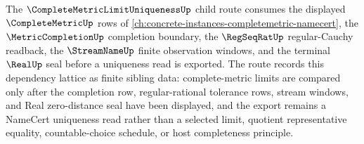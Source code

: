 The $\CompleteMetricLimitUniquenessUp$ child route consumes the displayed $\CompleteMetricUp$ rows of \autoref{ch:concrete-instances-completemetric-namecert}, the $\MetricCompletionUp$ completion boundary, the $\RegSeqRatUp$ regular-Cauchy readback, the $\StreamNameUp$ finite observation windows, and the terminal $\RealUp$ seal before a uniqueness read is exported. The route records this dependency lattice as finite sibling data: complete-metric limits are compared only after the completion row, regular-rational tolerance rows, stream windows, and Real zero-distance seal have been displayed, and the export remains a NameCert uniqueness read rather than a selected limit, quotient representative equality, countable-choice schedule, or host completeness principle.
